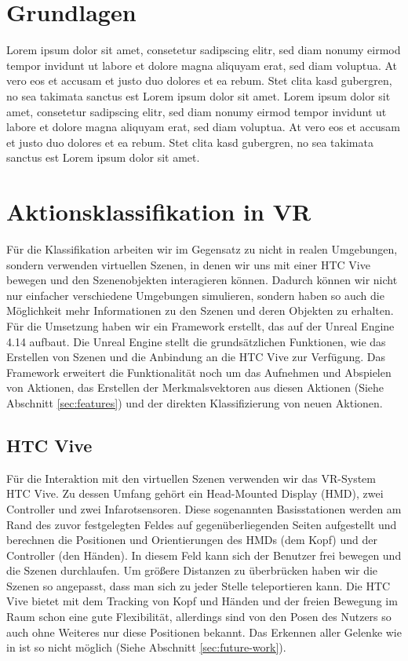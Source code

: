 
\section{Grundlagen}

Lorem ipsum dolor sit amet, consetetur sadipscing elitr, sed diam nonumy eirmod tempor invidunt ut labore et dolore magna aliquyam erat, sed diam voluptua. At vero eos et accusam et justo duo dolores et ea rebum. Stet clita kasd gubergren, no sea takimata sanctus est Lorem ipsum dolor sit amet. Lorem ipsum dolor sit amet, consetetur sadipscing elitr, sed diam nonumy eirmod tempor invidunt ut labore et dolore magna aliquyam erat, sed diam voluptua. At vero eos et accusam et justo duo dolores et ea rebum. Stet clita kasd gubergren, no sea takimata sanctus est Lorem ipsum dolor sit amet.


\section{Aktionsklassifikation in VR}

Für die Klassifikation arbeiten wir im Gegensatz zu \cite{scene-grok} nicht in realen Umgebungen, sondern verwenden virtuellen Szenen, in denen wir uns mit einer HTC Vive \cite{htc-vive} bewegen und den Szenenobjekten interagieren können. Dadurch können wir nicht nur einfacher verschiedene Umgebungen simulieren, sondern haben so auch die Möglichkeit mehr Informationen zu den Szenen und deren Objekten zu erhalten.
Für die Umsetzung haben wir ein Framework erstellt, das auf der Unreal Engine 4.14 \cite{ue4} aufbaut. Die Unreal Engine stellt die grundsätzlichen Funktionen, wie das Erstellen von Szenen und die Anbindung an die HTC Vive zur Verfügung. Das Framework erweitert die Funktionalität noch um das Aufnehmen und Abspielen von Aktionen, das Erstellen der Merkmalsvektoren aus diesen Aktionen (Siehe Abschnitt \ref{sec:features}) und der direkten Klassifizierung von neuen Aktionen.

\subsection{HTC Vive}
Für die Interaktion mit den virtuellen Szenen verwenden wir das VR-System HTC Vive. Zu dessen Umfang gehört ein Head-Mounted Display (HMD), zwei Controller und zwei Infarotsensoren. Diese sogenannten Basisstationen werden am Rand des zuvor festgelegten Feldes auf gegenüberliegenden Seiten aufgestellt und berechnen die Positionen und Orientierungen des HMDs (dem Kopf) und der Controller (den Händen). In diesem Feld kann sich der Benutzer frei bewegen und die Szenen durchlaufen. Um größere Distanzen zu überbrücken haben wir die Szenen so angepasst, dass man sich zu jeder Stelle teleportieren kann. Die HTC Vive bietet mit dem Tracking von Kopf und Händen und der freien Bewegung im Raum schon eine gute Flexibilität, allerdings sind von den Posen des Nutzers so auch ohne Weiteres nur diese Positionen bekannt. Das Erkennen aller Gelenke wie in \cite{scene-grok} ist so nicht möglich (Siehe Abschnitt \ref{sec:future-work}).

